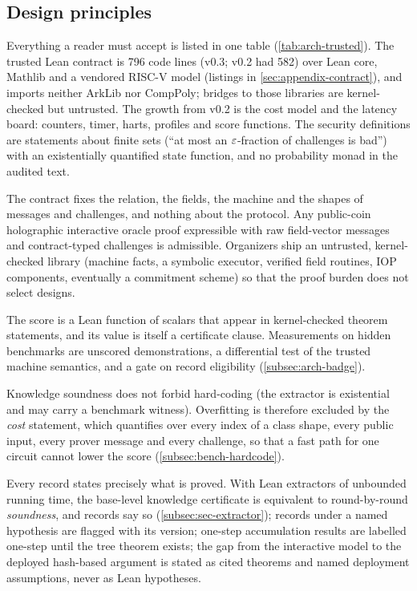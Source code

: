 \subsection{Design principles}\label{subsec:obj-principles}

\begin{description}[leftmargin=0pt,itemsep=2pt]
\item[P1. A small, auditable trusted base.] Everything a reader must accept is listed in one table
  (\cref{tab:arch-trusted}). The trusted Lean contract is 796 code lines (v0.3; v0.2 had 582) over
  Lean core, Mathlib and a vendored RISC-V model (listings in \cref{sec:appendix-contract}),
  and imports neither ArkLib nor CompPoly; bridges to those libraries are kernel-checked but
  untrusted. The growth from v0.2 is the cost model and the latency board: counters, timer, harts,
  profiles and score functions. The security definitions are statements about finite sets
  (\enquote{at most an $\varepsilon$-fraction of challenges is bad}) with an existentially quantified
  state function, and no probability monad in the audited text.
\item[P2. A large design space.] The contract fixes the relation, the fields, the machine and the
  shapes of messages and challenges, and nothing about the protocol. Any public-coin holographic
  interactive oracle proof expressible with raw field-vector messages and contract-typed challenges
  is admissible. Organizers ship an untrusted, kernel-checked library (machine facts, a symbolic
  executor, verified field routines, IOP components, eventually a commitment scheme) so that the
  proof burden does not select designs.
\item[P3. Scores are proved, not measured.] The score is a Lean function of scalars that appear
  in kernel-checked theorem statements, and its value is itself a certificate clause. Measurements on hidden benchmarks are unscored
  demonstrations, a differential test of the trusted machine semantics, and a gate on record
  eligibility (\cref{subsec:arch-badge}).
\item[P4. A class-uniform cost theorem.] Knowledge soundness does not forbid
  hard-coding (the extractor is existential and may carry a benchmark witness). Overfitting is
  therefore excluded by the \emph{cost} statement, which quantifies over every index of a class
  shape, every public input, every prover message and every challenge, so that a fast path for one
  circuit cannot lower the score (\cref{subsec:bench-hardcode}).
\item[P5. Honest labelling.] Every record states precisely what is proved. With Lean extractors
  of unbounded running time, the base-level knowledge certificate is equivalent to round-by-round
  \emph{soundness}, and records say so (\cref{subsec:sec-extractor}); records under a named
  hypothesis are flagged with its version; one-step accumulation results are labelled one-step until
  the tree theorem exists; the gap from the interactive model to the deployed hash-based argument is
  stated as cited theorems and named deployment assumptions, never as Lean hypotheses.
\end{description}

